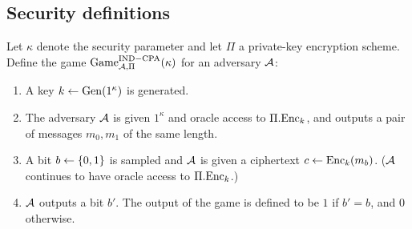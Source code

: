 %
%

\subsection{Security definitions}

\begin{definition}
	Let $\kappa$ denote the security parameter and let $\Pi$ a private-key encryption scheme. Define the game $\mathrm{Game}_{\mathcal{A}, \Pi}^{\mathrm{IND-CPA}}(\kappa)$ for an adversary $\mathcal{A}$:
	\begin{enumerate}[1.]
		\item A key $k \leftarrow \mathrm{Gen}(1^\kappa)$ is generated.
		\item The adversary $\mathcal{A}$ is given $1^\kappa$ and oracle access to $\Pi.\mathrm{Enc}_k$, and outputs a pair of messages $m_0, m_1$ of the same length.
		\item A bit $b \leftarrow \{0, 1\}$ is sampled and $\mathcal{A}$ is given a ciphertext $c \leftarrow \mathrm{Enc}_k(m_b)$. ($\mathcal{A}$ continues to have oracle access to $\Pi.\mathrm{Enc}_k$.)
		\item $\mathcal{A}$ outputs a bit $b'$. The output of the game is defined to be $1$ if $b' = b$, and $0$ otherwise.
	\end{enumerate}
\end{definition}

